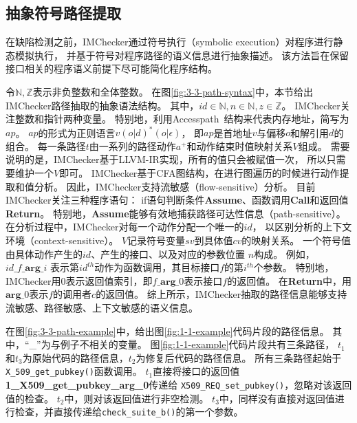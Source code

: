 \subsection{抽象符号路径提取}
在缺陷检测之前，IMChecker通过符号执行（symbolic execution）对程序进行静态模拟执行，
并基于符号对程序路径的语义信息进行抽象描述。
该方法旨在保留接口相关的程序语义前提下尽可能简化程序结构。



令$\mathbb{N, Z}$表示非负整数和全体整数。
在图\ref{fig:3-3-path-syntax}中，本节给出IMChecker路径抽取的抽象语法结构。
其中，$id \in \mathbb{N}, n \in \mathbb{N}, z \in \mathbb{Z}$。
IMChecker关注整数和指针两种变量。
特别地，利用Accesspath~\cite{15-ase-accesspath}结构来代表内存地址，简写为$ap$。
$ap$的形式为正则语言$v(o|d)^*(o|\epsilon)$，
即$ap$是首地址$v$与偏移$o$和解引用$d$的组合。
每一条路径$\mathit{t}$由一系列的路径动作$\mathit{a}^+$和动作结束时值映射关系$\mathit{V}$组成。
需要说明的是，IMChecker基于LLVM-IR实现，所有的值只会被赋值一次，
所以只需要维护一个$\mathit{V}$即可。
IMChecker基于CFA图结构，在进行图遍历的时候进行动作提取和值分析。
因此，IMChecker支持流敏感（flow-sensitive）分析。
目前IMChecker关注三种程序语句：
if语句判断条件\textbf{Assume}、函数调用\textbf{Call}和返回值\textbf{Return}。
特别地，\textbf{Assume}能够有效地捕获路径可达性信息（path-sensitive）。
在分析过程中，IMChecker对每一个动作分配一个唯一的$id$，
以区别分析的上下文环境（context-sensitive）。
$\mathit{V}$记录符号变量$\mathit{sv}$到具体值$\mathit{cv}$的映射关系。
一个符号值由具体动作产生的$id$、产生的接口、以及对应的参数位置 $\mathit{n}$构成。
例如， $\mathit{id}\_f\_\textbf{arg}\_\mathit{i}$
表示第$id^{th}$动作为函数调用，其目标接口$f$的第$\mathit{i}^{th}$个参数。
特别地，IMChecker用0表示返回值索引，即$f\_\textbf{arg}\_0$表示接口$f$的返回值。
在\textbf{Return}中，用$\textbf{arg}\_0$表示$f$的调用者$c$的返回值。
综上所示，IMChecker抽取的路径信息能够支持流敏感、路径敏感、上下文敏感的语义信息。

在图\ref{fig:3-3-path-example}中，给出图\ref{fig:1-1-example}代码片段的路径信息。
其中，“\_”为与例子不相关的变量。
图\ref{fig:1-1-example}代码片段共有三条路径，
$t_1$和$t_3$为原始代码的路径信息，$t_2$为修复后代码的路径信息。
所有三条路径起始于\texttt{X\_509\_get\_pubkey()}函数调用。
$t_1$直接将接口的返回值\textbf{1\_X509\_get\_pubkey\_arg\_0}传递给
\texttt{X509\_REQ\_set\_pubkey()}，忽略对该返回值的检查。
$t_2$中，则对该返回值进行非空检测。
$t_3$中，同样没有直接对返回值进行检查，并直接传递给\texttt{check\_suite\_b()}的第一个参数。

